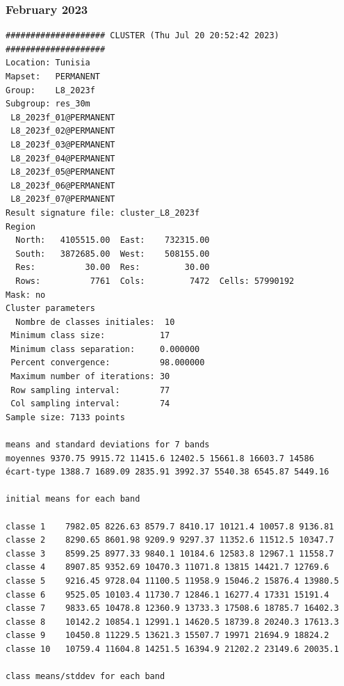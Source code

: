 \documentclass[environments,article,submit,pdftex,moreauthors]{Definitions/mdpi}
\begin{document}
\subsubsection[\appendixname~\thesubsubsection]{February 2023}
\begin{scriptsize}
\begin{verbatim}
#################### CLUSTER (Thu Jul 20 20:52:42 2023) ####################
Location: Tunisia
Mapset:   PERMANENT
Group:    L8_2023f
Subgroup: res_30m
 L8_2023f_01@PERMANENT
 L8_2023f_02@PERMANENT
 L8_2023f_03@PERMANENT
 L8_2023f_04@PERMANENT
 L8_2023f_05@PERMANENT
 L8_2023f_06@PERMANENT
 L8_2023f_07@PERMANENT
Result signature file: cluster_L8_2023f
Region
  North:   4105515.00  East:    732315.00
  South:   3872685.00  West:    508155.00
  Res:          30.00  Res:         30.00
  Rows:          7761  Cols:         7472  Cells: 57990192
Mask: no
Cluster parameters
  Nombre de classes initiales: 	10
 Minimum class size:           17
 Minimum class separation:     0.000000
 Percent convergence:          98.000000
 Maximum number of iterations: 30
 Row sampling interval:        77
 Col sampling interval:        74
Sample size: 7133 points

means and standard deviations for 7 bands
moyennes 9370.75 9915.72 11415.6 12402.5 15661.8 16603.7 14586
écart-type 1388.7 1689.09 2835.91 3992.37 5540.38 6545.87 5449.16

initial means for each band

classe 1    7982.05 8226.63 8579.7 8410.17 10121.4 10057.8 9136.81
classe 2    8290.65 8601.98 9209.9 9297.37 11352.6 11512.5 10347.7
classe 3    8599.25 8977.33 9840.1 10184.6 12583.8 12967.1 11558.7
classe 4    8907.85 9352.69 10470.3 11071.8 13815 14421.7 12769.6
classe 5    9216.45 9728.04 11100.5 11958.9 15046.2 15876.4 13980.5
classe 6    9525.05 10103.4 11730.7 12846.1 16277.4 17331 15191.4
classe 7    9833.65 10478.8 12360.9 13733.3 17508.6 18785.7 16402.3
classe 8    10142.2 10854.1 12991.1 14620.5 18739.8 20240.3 17613.3
classe 9    10450.8 11229.5 13621.3 15507.7 19971 21694.9 18824.2
classe 10   10759.4 11604.8 14251.5 16394.9 21202.2 23149.6 20035.1

class means/stddev for each band


\end{verbatim}
\end{scriptsize}
\end{document}
